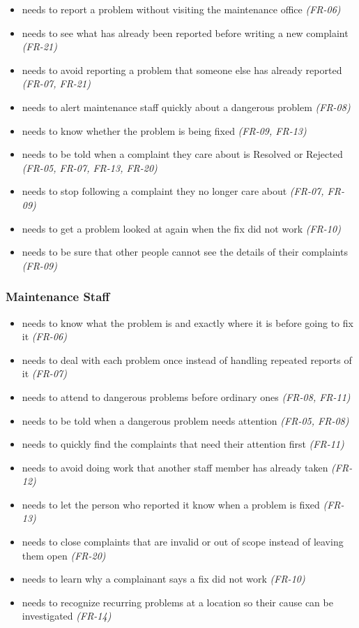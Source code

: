 \begin{itemize}
  \item needs to report a problem without visiting the maintenance office \textit{(FR-06)}
  \item needs to see what has already been reported before writing a new complaint \textit{(FR-21)}
  \item needs to avoid reporting a problem that someone else has already reported \textit{(FR-07, FR-21)}
  \item needs to alert maintenance staff quickly about a dangerous problem \textit{(FR-08)}
  \item needs to know whether the problem is being fixed \textit{(FR-09, FR-13)}
  \item needs to be told when a complaint they care about is Resolved or Rejected \textit{(FR-05, FR-07, FR-13, FR-20)}
  \item needs to stop following a complaint they no longer care about \textit{(FR-07, FR-09)}
  \item needs to get a problem looked at again when the fix did not work \textit{(FR-10)}
  \item needs to be sure that other people cannot see the details of their complaints \textit{(FR-09)}
\end{itemize}

\subsubsection*{Maintenance Staff}

\begin{itemize}
  \item needs to know what the problem is and exactly where it is before going to fix it \textit{(FR-06)}
  \item needs to deal with each problem once instead of handling repeated reports of it \textit{(FR-07)}
  \item needs to attend to dangerous problems before ordinary ones \textit{(FR-08, FR-11)}
  \item needs to be told when a dangerous problem needs attention \textit{(FR-05, FR-08)}
  \item needs to quickly find the complaints that need their attention first \textit{(FR-11)}
  \item needs to avoid doing work that another staff member has already taken \textit{(FR-12)}
  \item needs to let the person who reported it know when a problem is fixed \textit{(FR-13)}
  \item needs to close complaints that are invalid or out of scope instead of leaving them open \textit{(FR-20)}
  \item needs to learn why a complainant says a fix did not work \textit{(FR-10)}
  \item needs to recognize recurring problems at a location so their cause can be investigated \textit{(FR-14)}
\end{itemize}

